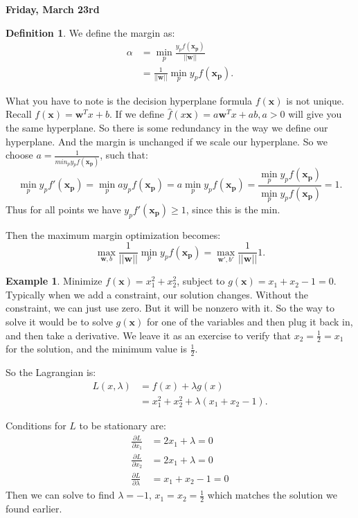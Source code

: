 \documentclass{amsbook}
\theoremstyle{plain}
\numberwithin{section}{chapter}
\numberwithin{equation}{chapter}
\theoremstyle{definition}
\newtheorem{Def}[theorem]{Definition}
\newtheorem{Ex}[theorem]{Example}
\theoremstyle{remark}
\newcommand{\bb}{\vspace{3mm}}
\newcommand{\vecc}{\mathbf}
\newcommand{\bee}{\begin{equation}\begin{aligned}}
\newcommand{\eee}{\end{aligned}\end{equation}}
\newcommand{\fracc}{\frac}
\begin{document}
\bb

\textbf{Friday, March 23rd}



\begin{Def}
We define the margin as:
\bee
\alpha &= \min_p \fracc{y_p f(\vecc{x_p})}{||\vecc{w}||}\\
&= \fracc{1}{||\vecc{w}||}\min_p y_p f(\vecc{x_p}).
\eee
\end{Def}

What you have to note is the decision hyperplane formula $f(\vecc{x})$ is not unique. Recall $f(\vecc{x}) = \vecc{w}^Tx + b$. If we define $\hat{f}(x\vecc{x}) = a\vecc{w}^Tx + ab, a>0$ will give you the same hyperplane. So there is some redundancy in the way we define our hyperplane. And the margin is unchanged if we scale our hyperplane. So we choose $a = \fracc{1}{
min_p y_p f(\vecc{x_p})}$, such that:
$$
\min_p y_p f'(\vecc{x_p}) = \min_p ay_p f(\vecc{x_p}) = a \min_p y_p f(\vecc{x_p}) = \fracc{\min_p y_pf(\vecc{x_p})}{\min_p y_pf(\vecc{x_p})} = 1. 
$$
Thus for all points we have $y_p f'(\vecc{x_p}) \geq 1$, since this is the min. 

Then the maximum margin optimization becomes:
$$
\max_{\vecc{w},b} \fracc{1}{||\vecc{w}||}\min_p y_p f(\vecc{x_p}) = \max_{\vecc{w'},b'} \fracc{1}{||\vecc{w}||}1.
$$


\begin{Ex}
Minimize $f(\vecc{x}) = x_1^2 + x_2^2$, subject to $g(\vecc{x}) = x_1 + x_2 - 1 = 0$. Typically when we add a constraint, our solution changes. Without the constraint, we can just use zero. But it will be nonzero with it. So the way to solve it would be to solve $g(\vecc{x})$ for one of the variables and then plug it back in, and then take a derivative. We leave it as an exercise to verify that $x_2 = \fracc{1}{2} = x_1$ for the solution, and the minimum value is $\fracc{1}{2}$. 

So the Lagrangian is:
\bee
L(x,\lambda) &= f(x) + \lambda g(x)\\
&= x_1^2 + x_2^2 + \lambda(x_1 + x_2 - 1).
\eee

Conditions for $L$ to be stationary are:
\bee
\fracc{\partial L}{\partial x_1} &= 2x_1 + \lambda = 0\\
\fracc{\partial L}{\partial x_2} &= 2x_1 + \lambda = 0\\
\fracc{\partial L}{\partial \lambda} &= x_1 + x_2 - 1 = 0
\eee
Then we can solve to find $\lambda = -1$, $x_1 = x_2 = \fracc{1}{2}$ which matches the solution we found earlier. 
\end{Ex}
\end{document}
